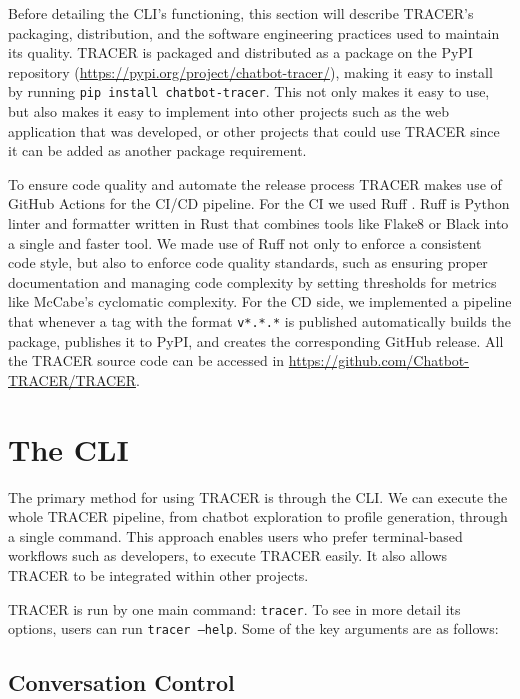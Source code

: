 Before detailing the \ac{CLI}'s functioning,
this section will describe \ac{TRACER}'s packaging, distribution,
and the software engineering practices used to maintain its quality.
\ac{TRACER} is packaged and distributed as a package on the \acf{PyPI} repository
(\url{https://pypi.org/project/chatbot-tracer/}),
making it easy to install by running
\texttt{pip install chatbot-tracer}.
This not only makes it easy to use,
but also makes it easy to implement into other projects
such as the web application that was developed,
or other projects that could use \ac{TRACER}
since it can be added as another package requirement.

To ensure code quality and automate the release process
\ac{TRACER} makes use of GitHub Actions for the \ac{CI/CD} pipeline.
For the \ac{CI} we used Ruff \autocite{Ruff}.
Ruff is Python linter and formatter written in Rust
that combines tools like Flake8 or Black into a single and faster tool.
We made use of Ruff not only to enforce a consistent code style,
but also to enforce code quality standards,
such as ensuring proper documentation
and managing code complexity by setting thresholds for metrics like McCabe's cyclomatic complexity.
For the \ac{CD} side,
we implemented a pipeline that whenever a tag with the format \texttt{v*.*.*} is published
automatically builds the package,
publishes it to \ac{PyPI},
and creates the corresponding GitHub release.
All the \ac{TRACER} source code can be accessed in \url{https://github.com/Chatbot-TRACER/TRACER}.

\section{The \acl{CLI}}

The primary method for using \ac{TRACER} is through the \ac{CLI}.
We can execute the whole \ac{TRACER} pipeline,
from chatbot exploration to profile generation,
through a single command.
This approach enables users who prefer terminal-based workflows
such as developers, to execute TRACER easily.
It also allows \ac{TRACER} to be integrated within other projects.

\ac{TRACER} is run by one main command: \texttt{tracer}.
To see in more detail its options, users can run \texttt{tracer --help}.
Some of the key arguments are as follows:

\subsection{Conversation Control}

